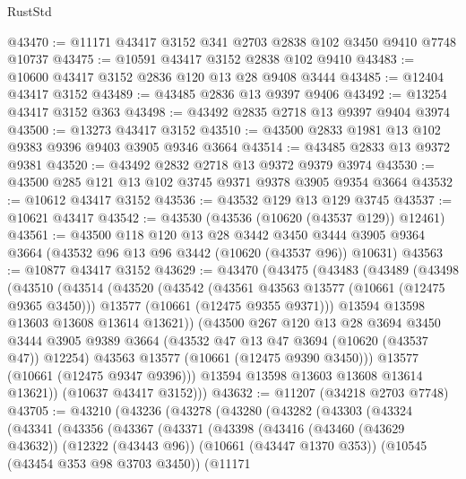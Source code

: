\begin{lexlean}{RustStd}
\begin{coremodule}
@43470 := @11171 @43417 @3152 @341 @2703 @2838 @102 @3450 @9410 @7748 @10737
@43475 := @10591 @43417 @3152 @2838 @102 @9410
@43483 := @10600 @43417 @3152 @2836 @120 @13 @28 @9408 @3444
@43485 := @12404 @43417 @3152
@43489 := @43485 @2836 @13 @9397 @9406
@43492 := @13254 @43417 @3152 @363
@43498 := @43492 @2835 @2718 @13 @9397 @9404 @3974
@43500 := @13273 @43417 @3152
@43510 := @43500 @2833 @1981 @13 @102 @9383 @9396 @9403 @3905 @9346 @3664
@43514 := @43485 @2833 @13 @9372 @9381
@43520 := @43492 @2832 @2718 @13 @9372 @9379 @3974
@43530 := @43500 @285 @121 @13 @102 @3745 @9371 @9378 @3905 @9354 @3664
@43532 := @10612 @43417 @3152
@43536 := @43532 @129 @13 @129 @3745
@43537 := @10621 @43417
@43542 := @43530 (@43536 (@10620 (@43537 @129)) @12461)
@43561 := @43500
    @118
    @120
    @13
    @28
    @3442
    @3450
    @3444
    @3905
    @9364
    @3664
    (@43532 @96 @13 @96 @3442 (@10620 (@43537 @96)) @10631)
@43563 := @10877 @43417 @3152
@43629 := @43470
    (@43475
      (@43483
        (@43489
          (@43498
            (@43510
              (@43514
                (@43520
                  (@43542
                    (@43561 @43563 @13577 (@10661 (@12475 @9365 @3450)))
                    @13577
                    (@10661 (@12475 @9355 @9371)))
                  @13594
                  @13598
                  @13603
                  @13608
                  @13614
                  @13621))
              (@43500
                @267
                @120
                @13
                @28
                @3694
                @3450
                @3444
                @3905
                @9389
                @3664
                (@43532 @47 @13 @47 @3694 (@10620 (@43537 @47)) @12254)
                @43563
                @13577
                (@10661 (@12475 @9390 @3450)))
              @13577
              (@10661 (@12475 @9347 @9396)))
            @13594
            @13598
            @13603
            @13608
            @13614
            @13621))
        (@10637 @43417 @3152)))
@43632 := @11207 (@34218 @2703 @7748)
@43705 := @43210
    (@43236
      (@43278
        (@43280
          (@43282
            (@43303
              (@43324
                (@43341
                  (@43356
                    (@43367
                      (@43371
                        (@43398
                          (@43416
                            (@43460 (@43629 @43632))
                            (@12322 (@43443 @96))
                            (@10661 (@43447 @1370 @353))
                            (@10545 (@43454 @353 @98 @3703 @3450))
                            (@11171

\end{coremodule}
\end{lexlean}
